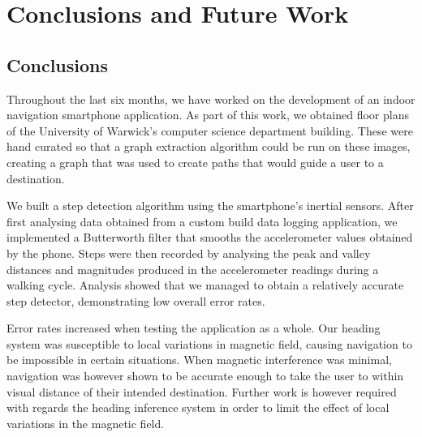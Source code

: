 \documentclass[main.tex]{subfiles}
\begin{document}
    \chapter{Conclusions and Future Work}
        \section{Conclusions}

Throughout the last six months, we have worked on the development of an indoor navigation smartphone application. As part of this work, we obtained floor plans of the University of Warwick's computer science department building. These were hand curated so that a graph extraction algorithm could be run on these images, creating a graph that was used to create paths that would guide a user to a destination.

We built a step detection algorithm using the smartphone's inertial sensors. After first analysing data obtained from a custom build data logging application, we implemented a Butterworth filter that smooths the accelerometer values obtained by the phone. Steps were then recorded by analysing the peak and valley distances and magnitudes produced in the accelerometer readings during a walking cycle. Analysis showed that we managed to obtain a relatively accurate step detector, demonstrating low overall error rates.

Error rates increased when testing the application as a whole. Our heading system was susceptible to local variations in magnetic field, causing navigation to be impossible in certain situations. When magnetic interference was minimal, navigation was however shown to be accurate enough to take the user to within visual distance of their intended destination. Further work is however required with regards the heading inference system in order to limit the effect of local variations in the magnetic field.
\end{document}
